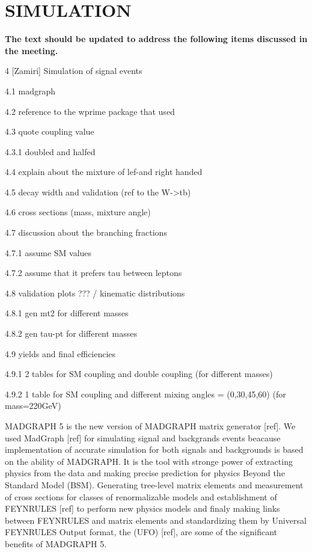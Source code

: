 \section{SIMULATION}\label{sec:evo}

{\bf The text should be updated to address the following items discussed in the meeting.}

4 [Zamiri] Simulation of signal events

4.1 madgraph

4.2 reference to the wprime package that used

4.3 quote coupling value

4.3.1 doubled and halfed

4.4 explain about the mixture of lef-and right handed

4.5 decay width and validation (ref to the W->tb)

4.6 cross sections (mass, mixture angle)

4.7 discussion about the branching fractions

4.7.1 assume SM values

4.7.2 assume that it prefers tau between leptons

4.8 validation plots ??? / kinematic distributions

4.8.1 gen mt2 for different masses

4.8.2 gen tau-pt for different masses

4.9 yields and final efficiencies

4.9.1 2 tables for SM coupling and double coupling (for different masses)

4.9.2 1 table for SM coupling and different mixing angles = (0,30,45,60) (for 
mass=220GeV)



{\small MADGRAPH 5} is the new version of {\small MADGRAPH} matrix generator [ref]. We used MadGraph [ref] for simulating signal and backgrands events beacause implementation of accurate simulation for both signals and backgrounds is based on the ability of {\small MADGRAPH}. It is the tool with stronge power of extracting physics from the data and making precise prediction for physics Beyond the Standard Model {\small (BSM)}. Generating tree-level matrix elements and measurement of cross sections for classes of renormalizable models and establishment of {\small FEYNRULES} [ref] to perform new physics models and finaly making links between {\small FEYNRULES} and matrix elements and standardizing them by Universal F{\small EYNRULES} Output format, the {\small (UFO)} [ref], are some of the significant benefits of {\small MADGRAPH 5}.

